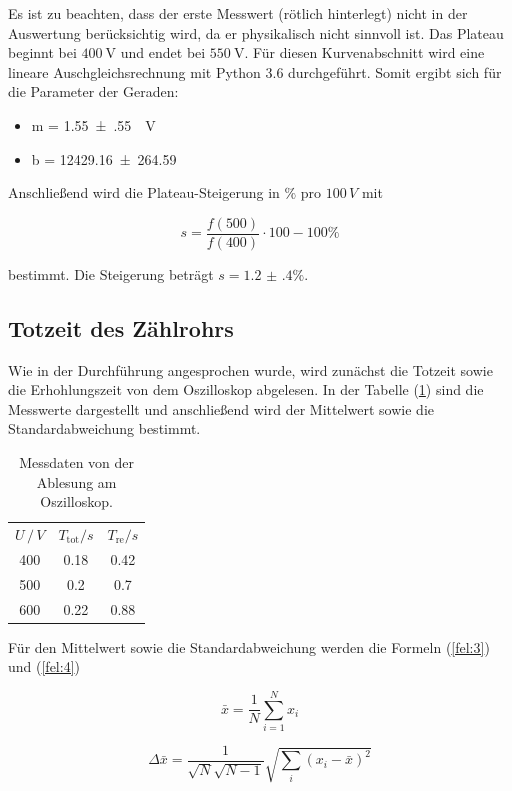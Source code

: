Es ist zu beachten, dass der erste Messwert (rötlich hinterlegt) nicht in der Auswertung berücksichtig wird,
da er physikalisch nicht sinnvoll ist.
Das Plateau beginnt bei $\SI{400}{\volt}$ und endet bei $\SI{550}{\volt}$.
Für diesen Kurvenabschnitt wird eine lineare Auschgleichsrechnung mit Python 3.6 durchgeführt.
Somit ergibt sich für die Parameter der Geraden:

\begin{itemize}
  \item m = \SI{1.55(55)}{\per\volt}
  \item b = \num{12429.16(26459)}
\end{itemize}

Anschließend wird die Plateau-Steigerung in $\%$ pro $100 \, V$ mit

\begin{equation*}
  s = \frac{f(500)}{f(400)} \cdot 100 - 100 \%
\end{equation*}

bestimmt.
Die Steigerung beträgt $s = \num{1.2(4)} \%$.

\subsection{Totzeit des Zählrohrs}
Wie in der Durchführung angesprochen wurde, wird zunächst die Totzeit sowie die Erhohlungszeit von dem Oszilloskop
abgelesen. In der Tabelle (\ref{tab:2}) sind die Messwerte dargestellt und anschließend wird der Mittelwert sowie die Standardabweichung
bestimmt.
\begin{table}[H]
  \centering
  \caption{Messdaten von der Ablesung am Oszilloskop.}
  \label{tab:2}
  \begin{tabular}{c c c}
    \toprule
    $U \, /\, V$ & $T_\text{tot} / s$ & $T_\text{re} / s$\\
    400 & 0.18 & 0.42\\
    500 & 0.2 & 0.7\\
    600 & 0.22 & 0.88\\
    \bottomrule
  \end{tabular}
\end{table}
Für den Mittelwert sowie die Standardabweichung werden die Formeln (\ref{fel:3}) und (\ref{fel:4})

\begin{equation}
    \bar{x} = \frac{1}{N} \sum_{i=1}^{N} x_i
    \label{fel:3}
\end{equation}

\begin{equation}
  \Delta \bar{x} = \frac{1}{\sqrt{N}\sqrt{N-1}} \sqrt{\sum_{i}(x_i-\bar{x})^2}
  \label{fel:4}
\end{equation}

